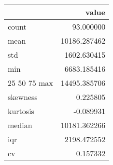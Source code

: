 \begin{tabular}{lr}
\toprule
 & value \\
\midrule
count & 93.000000 \\
mean & 10186.287462 \\
std & 1602.630415 \\
min & 6683.185416 \\
25%
50%
75%
max & 14495.385706 \\
skewness & 0.225805 \\
kurtosis & -0.089931 \\
median & 10181.362266 \\
iqr & 2198.472552 \\
cv & 0.157332 \\
\bottomrule
\end{tabular}

